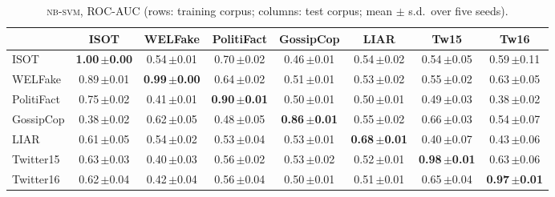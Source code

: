 \begin{table}[h]
\centering
\caption{\textsc{nb-svm}, ROC-AUC (rows: training corpus; columns: test corpus; mean $\pm$ s.d.\ over five seeds).}
\scriptsize
\begin{tabular}{@{}lccccccc@{}}
\toprule
 & ISOT & WELFake & PolitiFact & GossipCop & LIAR & Tw15 & Tw16 \\
\midrule
ISOT & \textbf{1.00\,{\tiny$\pm$0.00}} & 0.54\,{\tiny$\pm$0.01} & 0.70\,{\tiny$\pm$0.02} & 0.46\,{\tiny$\pm$0.01} & 0.54\,{\tiny$\pm$0.02} & 0.54\,{\tiny$\pm$0.05} & 0.59\,{\tiny$\pm$0.11} \\
WELFake & 0.89\,{\tiny$\pm$0.01} & \textbf{0.99\,{\tiny$\pm$0.00}} & 0.64\,{\tiny$\pm$0.02} & 0.51\,{\tiny$\pm$0.01} & 0.53\,{\tiny$\pm$0.02} & 0.55\,{\tiny$\pm$0.02} & 0.63\,{\tiny$\pm$0.05} \\
PolitiFact & 0.75\,{\tiny$\pm$0.02} & 0.41\,{\tiny$\pm$0.01} & \textbf{0.90\,{\tiny$\pm$0.01}} & 0.50\,{\tiny$\pm$0.01} & 0.50\,{\tiny$\pm$0.01} & 0.49\,{\tiny$\pm$0.03} & 0.38\,{\tiny$\pm$0.02} \\
GossipCop & 0.38\,{\tiny$\pm$0.02} & 0.62\,{\tiny$\pm$0.05} & 0.48\,{\tiny$\pm$0.05} & \textbf{0.86\,{\tiny$\pm$0.01}} & 0.55\,{\tiny$\pm$0.02} & 0.66\,{\tiny$\pm$0.03} & 0.54\,{\tiny$\pm$0.07} \\
LIAR & 0.61\,{\tiny$\pm$0.05} & 0.54\,{\tiny$\pm$0.02} & 0.53\,{\tiny$\pm$0.04} & 0.53\,{\tiny$\pm$0.01} & \textbf{0.68\,{\tiny$\pm$0.01}} & 0.40\,{\tiny$\pm$0.07} & 0.43\,{\tiny$\pm$0.06} \\
Twitter15 & 0.63\,{\tiny$\pm$0.03} & 0.40\,{\tiny$\pm$0.03} & 0.56\,{\tiny$\pm$0.02} & 0.53\,{\tiny$\pm$0.02} & 0.52\,{\tiny$\pm$0.01} & \textbf{0.98\,{\tiny$\pm$0.01}} & 0.63\,{\tiny$\pm$0.06} \\
Twitter16 & 0.62\,{\tiny$\pm$0.04} & 0.42\,{\tiny$\pm$0.04} & 0.56\,{\tiny$\pm$0.04} & 0.50\,{\tiny$\pm$0.01} & 0.51\,{\tiny$\pm$0.01} & 0.65\,{\tiny$\pm$0.04} & \textbf{0.97\,{\tiny$\pm$0.01}} \\
\bottomrule
\end{tabular}
\end{table}

